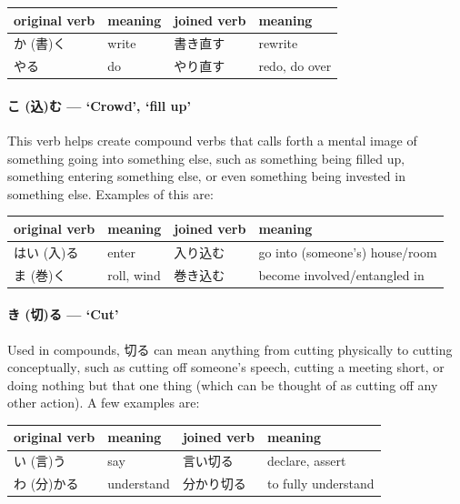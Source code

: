 \documentclass[11pt, b5paper, twoside, openright, onecolumn]{book}
\makeatletter
\newcommand*{\rtrubystack}[2]{{\relscale{0.5}%
  \begin{tabular}[b]{@{}c@{}}%
    {#1}\\%
    {\textscale{2}{#2}}%
  \end{tabular}}%
}
\DeclareRobustCommand*{\rtruby}[2]{%
  \mbox{%
    \setlength{\parskip}{0ex}%
    \BeginAccSupp{method=pdfstringdef,ActualText={#1}}%
      \rtrubystack{\phantom{#2}}{#1}%
      \llap{%
        \rtrubystack{#2}{\phantom{#1}}%
      }%
    \EndAccSupp{}%
  }%
}
\newcommand*{\rubystack}[2]{{\relscale{0.5}%
  \begin{tabular}[b]{@{}c@{}}%
    {#1}\\%
   {\textscale{2}{#2}}%
  \end{tabular}}%
}
\DeclareRobustCommand*{\ruby}[2]{%
  \mbox{%
    \setlength{\parskip}{0ex}%
    \BeginAccSupp{method=pdfstringdef,ActualText={#1}}%
      \rubystack{\phantom{#2}}{#1}%
      \llap{%
        \rubystack{#2}{\phantom{#1}}%
      }%
    \EndAccSupp{}%
  }%
}
\renewcommand*{\rtruby}[2]{#2 (#1)}%
\renewcommand*{\ruby}[2]{#2 (#1)}%
\newenvironment{mytabular}[1]{\noindent\hspace{0.4in}
\begin{tabular}[h]{#1}}{\end{tabular}}
\makeatother
\begin{document}
\vspace{0.5cm}
\smaller
\begin{mytabular}{| l  l  l  l |}\hline 
\rule{0pt}{2.4ex}original verb & meaning & joined verb & meaning\\ 
\hline
\rule{0pt}{3.6ex}\rtruby{書}{か}く & write & 書き直す & rewrite\\ 
\rule{0pt}{2.4ex}やる & do & やり直す & redo‚ do over\\ 
\hline 
\end{mytabular}
\larger
\vspace{0.5cm}


\paragraph{\ruby{込}{こ}む — ‘Crowd’‚ ‘fill up’}

This verb helps create compound verbs that calls forth a mental image of something going into something else‚ such as something being filled up‚ something entering something else‚ or even something being invested in something else. Examples of this are:

\vspace{0.5cm}
\smaller
\begin{mytabular}{| l  l  l  l |}\hline 
\rule{0pt}{2.4ex}original verb & meaning & joined verb & meaning\\ 
\hline
\rule{0pt}{3.6ex}\rtruby{入}{はい}る & enter & 入り込む & go into (someone’s) house/room\\ 
\rule{0pt}{3.6ex}\rtruby{巻}{ま}く & roll‚ wind & 巻き込む & become involved/entangled in\\ 
\hline 
\end{mytabular}
\larger
\vspace{0.5cm}


\paragraph{\ruby{切}{き}る — ‘Cut’}

Used in compounds‚ 切る can mean anything from cutting physically to cutting conceptually‚ such as cutting off someone’s speech‚ cutting a meeting short‚ or doing nothing but that one thing (which can be thought of as cutting off any other action). A few examples are:

\vspace{0.5cm}
\smaller
\begin{mytabular}{| l  l  l  l |}\hline 
\rule{0pt}{2.4ex}original verb & meaning & joined verb & meaning\\ 
\hline
\rule{0pt}{3.6ex}\rtruby{言}{い}う & say & 言い切る & declare‚ assert\\ 
\rule{0pt}{3.6ex}\rtruby{分}{わ}かる & understand & 分かり切る & to fully understand\\ 
\hline 
\end{mytabular}
\larger
\vspace{0.5cm}
\end{document}
